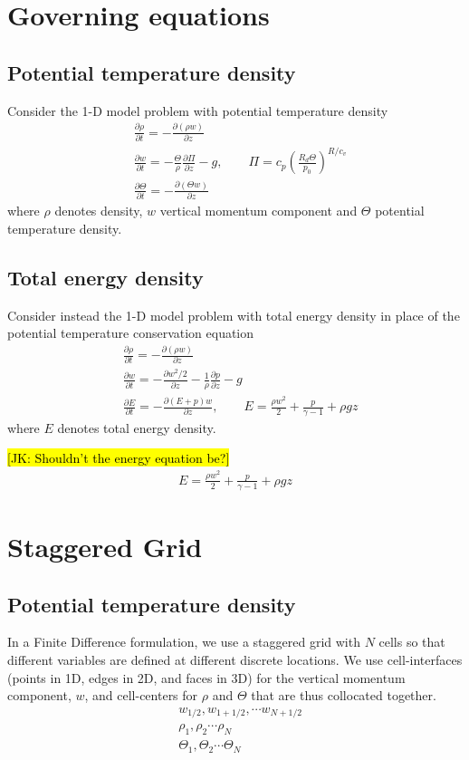 \documentclass{report}
\begin{document}
\section{Governing equations}
\subsection{Potential temperature density}
Consider the 1-D model problem with potential temperature density
\begin{align*}
&\frac{\partial \rho}{\partial t} = - \frac{\partial (\rho w)}{\partial z}  \\
&\frac{\partial w}{\partial t} = - \frac{ \Theta}{\rho}\frac{\partial  \Pi}{\partial z} - g , \qquad \Pi = c_p\left(\frac{R_d\Theta}{p_0}\right)^{R/c_v}\\
&\frac{\partial \Theta}{\partial t} = - \frac{\partial (\Theta w)}{\partial z}
\end{align*}
where $\rho$ denotes density, $w$ vertical momentum component and $\Theta$ potential temperature density.

\subsection{Total energy density}
Consider instead the 1-D model problem with total energy density in place of the potential temperature conservation equation
\begin{align*}
&\frac{\partial \rho}{\partial t} = - \frac{\partial (\rho w)}{\partial z}  \\
&\frac{\partial w}{\partial t} = - \frac{\partial  w^2/2}{\partial z} - \frac{1}{\rho}\frac{\partial p}{\partial z} - g \\
&\frac{\partial E}{\partial t} = - \frac{\partial (E + p)w}{\partial z},  \qquad E = \frac{\rho w^2}{2} + \frac{p}{\gamma-1} + \rho g z
\end{align*}
where $E$ denotes total energy density.

\hl{[JK: Shouldn't the energy equation be?]}
\begin{align*}
E = \frac{\rho w^2}{2} + \frac{p}{\gamma-1} + \rho g z
\end{align*}

\section{Staggered Grid}
\subsection{Potential temperature density}
In a Finite Difference formulation, we use a staggered grid with $N$ cells so that different variables are defined at different discrete locations. We use cell-interfaces (points in 1D, edges in 2D, and faces in 3D) for the vertical momentum component, $w$, and cell-centers for $\rho$ and $\Theta$ that are thus collocated together.
\begin{align*}
&w_{1/2},          w_{1+1/2},          \cdots w_{N+1/2} \\
&\rho_{1}, \rho_{2} \cdots \rho_{N} \\
&\Theta_{1}, \Theta_{2} \cdots \Theta_{N}
\end{align*}
\end{document}
